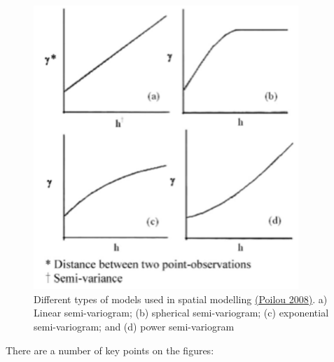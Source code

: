 \documentclass{article}
\begin{document}
\begin{figure}[h]
    \centering
    \caption{Different types of models used in spatial modelling \href{https://www.publichealth.columbia.edu/research/population-health-methods/kriging-interpolation}{(Poilou 2008)}. a) Linear semi-variogram; (b) spherical semi-variogram; (c) exponential semi-variogram; and (d) power semi-variogram}
    \includegraphics[width=10cm]{semivariogram-models.png}
\end{figure} 

There are a number of key points on the figures:
\end{document}
